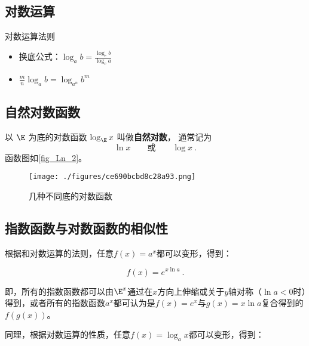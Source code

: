 \begin{issues}
\issueDraft
\end{issues}
\subsection{对数运算}

\begin{theorem}{对数运算法则}
\begin{itemize}
\item 换底公式：$\displaystyle \log_a b=\frac{\log_cb}{\log_ca}$
\item $\displaystyle \frac{m}{n}\log_a b=\log_{a^n} b^m$
\end{itemize}
\end{theorem}

\subsection{自然对数函数}
以 $\E$ 为底的对数函数 $\log_{\E} x$ 叫做\textbf{自然对数}， 通常记为
\begin{equation}
\ln x \qquad \text{或} \qquad \log x~.
\end{equation}
函数图如\autoref{fig_Ln_2}。
\begin{figure}[ht]
\centering
\texttt{[image: ./figures/ce690bcbd8c28a93.png]}
\caption{几种不同底的对数函数} \label{fig_Ln_2}
\end{figure}


\subsection{指数函数与对数函数的相似性}


根据和对数运算的法则，任意$f(x)=a^x$都可以变形，得到：

\begin{equation}
f(x)=e^{x\ln a}~.
\end{equation}

即，所有的指数函数都可以由$\E^x$通过在$x$方向上伸缩或关于$y$轴对称（$\ln a<0$时）得到，或者所有的指数函数$a^x$都可认为是$f(x)=e^x$与$g(x)=x\ln a$复合得到的$f(g(x))$。

同理，根据对数运算的性质，任意$f(x)=\log_ax$都可以变形，得到：

